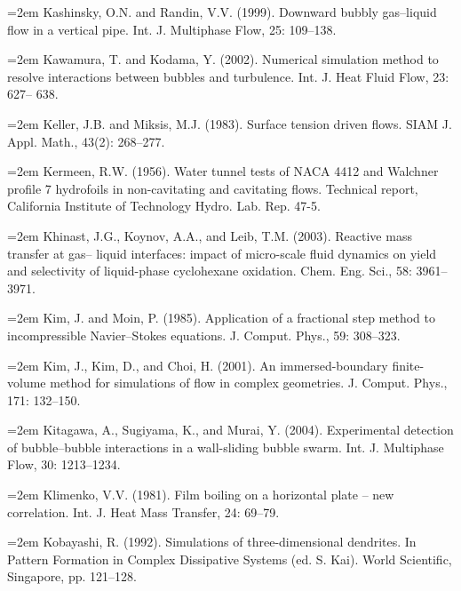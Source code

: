 \documentclass[11pt,a4paper,openany,fontset=none]{ctexbook}
\begin{document}
\par\hangindent=2em Kashinsky, O.N. and Randin, V.V. (1999). Downward bubbly gas--liquid flow in a vertical pipe. Int. J. Multiphase Flow, 25: 109--138.

\par\hangindent=2em Kawamura, T. and Kodama, Y. (2002). Numerical simulation method to resolve interactions between bubbles and turbulence. Int. J. Heat Fluid Flow, 23: 627-- 638.

\par\hangindent=2em Keller, J.B. and Miksis, M.J. (1983). Surface tension driven flows. SIAM J. Appl. Math., 43(2): 268--277.

\par\hangindent=2em Kermeen, R.W. (1956). Water tunnel tests of NACA 4412 and Walchner profile 7 hydrofoils in non-cavitating and cavitating flows. Technical report, California Institute of Technology Hydro. Lab. Rep. 47-5.


\par\hangindent=2em Khinast, J.G., Koynov, A.A., and Leib, T.M. (2003). Reactive mass transfer at gas-- liquid interfaces: impact of micro-scale fluid dynamics on yield and selectivity of liquid-phase cyclohexane oxidation. Chem. Eng. Sci., 58: 3961--3971.

\par\hangindent=2em Kim, J. and Moin, P. (1985). Application of a fractional step method to incompressible Navier--Stokes equations. J. Comput. Phys., 59: 308--323.

\par\hangindent=2em Kim, J., Kim, D., and Choi, H. (2001). An immersed-boundary finite-volume method for simulations of flow in complex geometries. J. Comput. Phys., 171: 132--150.

\par\hangindent=2em Kitagawa, A., Sugiyama, K., and Murai, Y. (2004). Experimental detection of bubble--bubble interactions in a wall-sliding bubble swarm. Int. J. Multiphase Flow, 30: 1213--1234.

\par\hangindent=2em Klimenko, V.V. (1981). Film boiling on a horizontal plate -- new correlation. Int. J. Heat Mass Transfer, 24: 69--79.

\par\hangindent=2em Kobayashi, R. (1992). Simulations of three-dimensional dendrites. In Pattern Formation in Complex Dissipative Systems (ed. S. Kai). World Scientific, Singapore, pp. 121--128.
\end{document}
